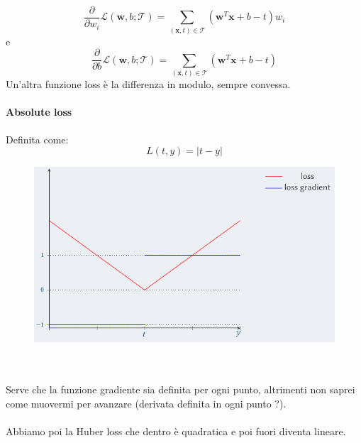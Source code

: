 \documentclass[12pt, oneside]{extbook}
\begin{document}
\begin{equation}
	\frac{\partial}{\partial w_i}\mathscr{L}(\textbf{w},b;\mathscr{T}) = \sum\limits_{(\textbf{x},t) \in \mathscr{T}} (\textbf{w}^T \textbf{x}+b -t)w_i
\end{equation}
e
\begin{equation}
	\frac{\partial}{\partial b}\mathscr{L}(\textbf{w},b;\mathscr{T}) = \sum\limits_{(\textbf{x},t) \in \mathscr{T}} (\textbf{w}^T \textbf{x}+b -t)
\end{equation}
Un'altra funzione loss è la differenza in modulo, sempre convessa.
\paragraph{Absolute loss} Definita come:
\begin{equation}
	L(t,y) = |t-y|
\end{equation}
\begin{figure}
	\includegraphics[scale=0.5]{immagini/abs_loss.png}
\end{figure}\\\\
Serve che la funzione gradiente sia definita per ogni punto, altrimenti non saprei come muovermi per avanzare (derivata definita in ogni punto ?).\\\\Abbiamo poi la Huber loss che dentro è quadratica e poi fuori diventa lineare. 
\end{document}
